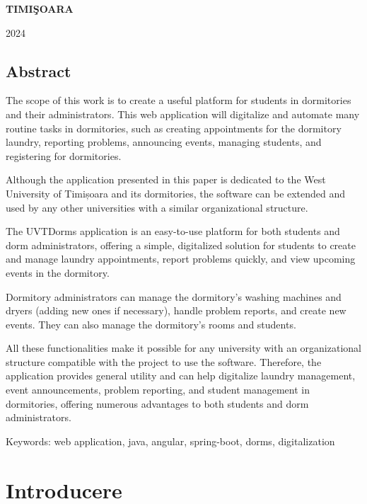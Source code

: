 \documentclass[12pt,a4paper]{report}
\theoremstyle{definition}
\theoremstyle{remark}
\begin{document}
\vfill
\begin{center}
    {\bf TIMI\c SOARA

        2024}
\end{center}
\newpage
\normalsize{}
\section*{Abstract}

\par The scope of this work is to create a useful platform for students in dormitories and their administrators. This web application will digitalize and automate many routine tasks in dormitories, such as creating appointments for the dormitory laundry, reporting problems, announcing events, managing students, and registering for dormitories. 

\par Although the application presented in this paper is dedicated to the West University of Timișoara and its dormitories, the software can be extended and used by any other universities with a similar organizational structure.

\par The UVTDorms application is an easy-to-use platform for both students and dorm administrators, offering a simple, digitalized solution for students to create and manage laundry appointments, report problems quickly, and view upcoming events in the dormitory.

\par Dormitory administrators can manage the dormitory's washing machines and \textnormal{dry\-ers} (adding new ones if necessary), handle problem reports, and create new events. They can also manage the dormitory's rooms and students.

\par All these functionalities make it possible for any university with an organizational structure compatible with the project to use the software. Therefore, the application provides general utility and can help digitalize laundry management, event announcements, problem reporting, and student management in dormitories, offering numerous advantages to both students and dorm administrators.
\vspace{3em}
\par Keywords: web application, java, angular, spring-boot, dorms, digitalization

\tableofcontents

\chapter{Introducere}
\end{document}
